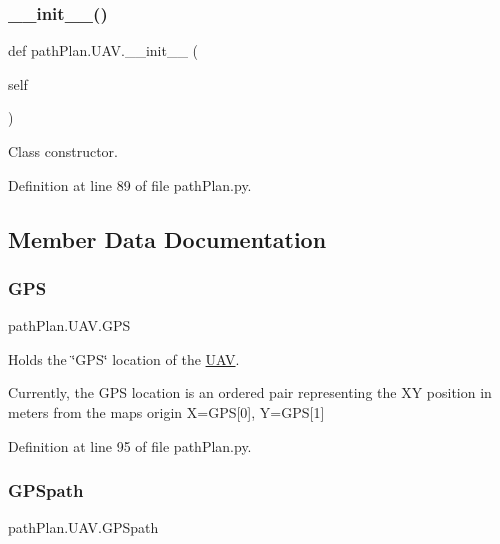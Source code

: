 \subsubsection{\texorpdfstring{\+\_\+\+\_\+init\+\_\+\+\_\+()}{\_\_init\_\_()}}
{\footnotesize\ttfamily def path\+Plan.\+U\+A\+V.\+\_\+\+\_\+init\+\_\+\+\_\+ (\begin{DoxyParamCaption}\item[{}]{self }\end{DoxyParamCaption})}



Class constructor. 



Definition at line 89 of file path\+Plan.\+py.



\subsection{Member Data Documentation}
\mbox{\label{classpath_plan_1_1_u_a_v_a759acf47734cd05447afe9e4a3f61307}} 
\subsubsection{\texorpdfstring{G\+PS}{GPS}}
{\footnotesize\ttfamily path\+Plan.\+U\+A\+V.\+G\+PS}



Holds the \char`\"{}\+G\+P\+S\char`\"{} location of the \mbox{\hyperlink{classpath_plan_1_1_u_a_v}{U\+AV}}. 

Currently, the G\+PS location is an ordered pair representing the XY position in meters from the map\textquotesingle{}s origin X=G\+PS\mbox{[}0\mbox{]}, Y=G\+PS\mbox{[}1\mbox{]} 

Definition at line 95 of file path\+Plan.\+py.

\mbox{\label{classpath_plan_1_1_u_a_v_a1d6d4797e8ac522de0da65ba882b8616}} 
\subsubsection{\texorpdfstring{G\+P\+Spath}{GPSpath}}
{\footnotesize\ttfamily path\+Plan.\+U\+A\+V.\+G\+P\+Spath}



